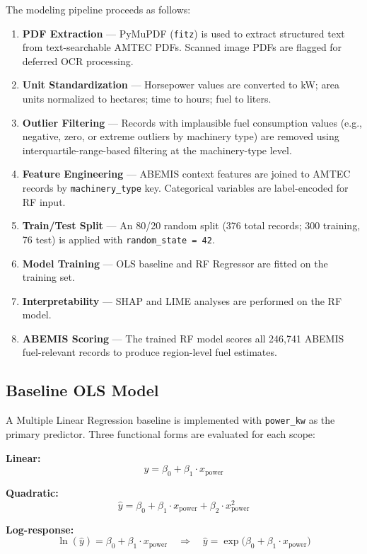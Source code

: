 \documentclass[conference]{IEEEtran}
\begin{document}
The modeling pipeline proceeds as follows:
\begin{enumerate}
  \item \textbf{PDF Extraction} --- PyMuPDF (\texttt{fitz}) is used to extract structured text from text-searchable AMTEC PDFs. Scanned image PDFs are flagged for deferred OCR processing.
  \item \textbf{Unit Standardization} --- Horsepower values are converted to kW; area units normalized to hectares; time to hours; fuel to liters.
  \item \textbf{Outlier Filtering} --- Records with implausible fuel consumption values (e.g., negative, zero, or extreme outliers by machinery type) are removed using interquartile-range-based filtering at the machinery-type level.
  \item \textbf{Feature Engineering} --- ABEMIS context features are joined to AMTEC records by \texttt{machinery\_type} key. Categorical variables are label-encoded for RF input.
  \item \textbf{Train/Test Split} --- An 80/20 random split (376 total records; 300 training, 76 test) is applied with \texttt{random\_state\,=\,42}.
  \item \textbf{Model Training} --- OLS baseline and RF Regressor are fitted on the training set.
  \item \textbf{Interpretability} --- SHAP and LIME analyses are performed on the RF model.
  \item \textbf{ABEMIS Scoring} --- The trained RF model scores all 246,741 ABEMIS fuel-relevant records to produce region-level fuel estimates.
\end{enumerate}

\subsection{Baseline OLS Model}

A Multiple Linear Regression baseline is implemented with \texttt{power\_kw} as the primary predictor. Three functional forms are evaluated for each scope:

\textbf{Linear:}
\[
\hat{y} = \beta_0 + \beta_1 \cdot x_{\text{power}}
\]

\textbf{Quadratic:}
\[
\hat{y} = \beta_0 + \beta_1 \cdot x_{\text{power}} + \beta_2 \cdot x_{\text{power}}^2
\]

\textbf{Log-response:}
\[
\ln(\hat{y}) = \beta_0 + \beta_1 \cdot x_{\text{power}} \quad \Longrightarrow \quad \hat{y} = \exp\!\bigl(\beta_0 + \beta_1 \cdot x_{\text{power}}\bigr)
\]
\end{document}
